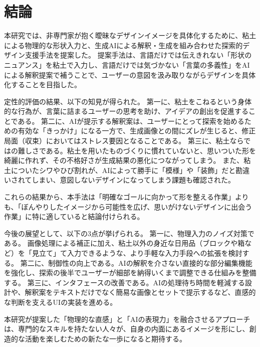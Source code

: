 \documentclass{kuisthesis}
\begin{document}
\section{結論} 
本研究では、非専門家が抱く曖昧なデザインイメージを具体化するために、粘土による物理的な形状入力と、生成AIによる解釈・生成を組み合わせた探索的デザイン支援手法を提案した。 
提案手法は、言語だけでは伝えきれない「形状のニュアンス」を粘土で入力し、言語だけでは気づかない「言葉の多義性」をAIによる解釈提案で補うことで、ユーザーの意図を汲み取りながらデザインを具体化することを目指した。

定性的評価の結果、以下の知見が得られた。 
第一に、粘土をこねるという身体的な行為が、言葉に詰まるユーザーの思考を助け、アイデアの創出を促進することである。 
第二に、AIが提示する解釈案は、ユーザーにとって探索を始めるための有効な「きっかけ」になる一方で、生成画像との間にズレが生じると、修正局面（収束）においてはストレス要因となることである。 
第三に、粘土ならではの難しさである。粘土を用いたものづくりに慣れていないと、思いついた形を綺麗に作れず、その不格好さが生成結果の悪化につながってしまう。
また、粘土についたシワやひび割れが、AIによって勝手に「模様」や「装飾」だと勘違いされてしまい、意図しないデザインになってしまう課題も確認された。

これらの結果から、本手法は「明確なゴールに向かって形を整える作業」よりも、「ぼんやりしたイメージから可能性を広げ、思いがけないデザインに出会う作業」に特に適していると結論付けられる。

今後の展望として、以下の3点が挙げられる。 
第一に、物理入力のノイズ対策である。
画像処理による補正に加え、粘土以外の身近な日用品（ブロックや箱など）を「見立て」て入力できるような、より手軽な入力手段への拡張を検討する。 
第二に、制御性の向上である。AIの解釈を介さない直接的な部分編集機能を強化し、探索の後半でユーザーが細部を納得いくまで調整できる仕組みを整備する。 
第三に、インタフェースの改善である。AIの処理待ち時間を軽減する設計や、解釈案をテキストだけでなく簡易な画像とセットで提示するなど、直感的な判断を支えるUIの実装を進める。

本研究が提案した「物理的な直感」と「AIの表現力」を融合させるアプローチは、専門的なスキルを持たない人々が、自身の内面にあるイメージを形にし、創造的な活動を楽しむための新たな一歩になると期待する。


\acknowledgments
%
% 
%
\end{document}
